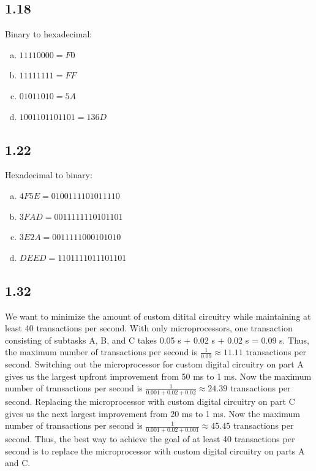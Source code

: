 \documentclass{article}
\begin{document}
\subsection*{1.18}
Binary to hexadecimal:
\begin{enumerate}[(a)]
    \item $11110000 = F0$
    \item $11111111 = FF$
    \item $01011010 = 5A$
    \item $1001101101101 = 136D$
\end{enumerate}

\subsection*{1.22}
Hexadecimal to binary:
\begin{enumerate}[(a)]
    \item $4F5E = 0100111101011110$
    \item $3FAD = 0011111110101101$
    \item $3E2A = 0011111000101010$
    \item $DEED = 1101111011101101$
\end{enumerate}

\subsection*{1.32}
We want to minimize the amount of custom ditital circuitry while maintaining at least 40 transactions per second.
With only microprocessors, one transaction consisting of subtasks A, B, and C takes 0.05 s + 0.02 s + 0.02 s = 0.09 s.
Thus, the maximum number of transactions per second is $\frac{1}{0.09} \approx 11.11$ transactions per second.
Switching out the microprocessor for custom digital circuitry on part A gives us the largest upfront improvement from 50 ms to 1 ms.
Now the maximum number of transactions per second is $\frac{1}{0.001 + 0.02 + 0.02} \approx 24.39$ transactions per second.
Replacing the microprocessor with custom digital circuitry on part C gives us the next largest improvement from 20 ms to 1 ms.
Now the maximum number of transactions per second is $\frac{1}{0.001 + 0.02 + 0.001} \approx 45.45$ transactions per second.
Thus, the best way to achieve the goal of at least 40 transactions per second is to replace the microprocessor with custom digital circuitry on parts A and C.
\end{document}
